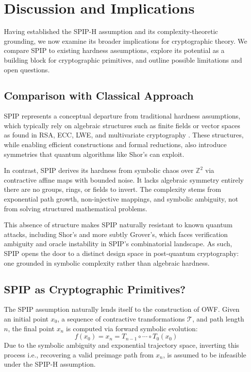 \documentclass[twocolumn,10pt]{article}
\begin{document}
\section{Discussion and Implications} \label{sec:discussion}
\vspace{0.8em}

Having established the SPIP-H assumption and its complexity-theoretic grounding, we now examine its broader implications for cryptographic theory. We compare SPIP to existing hardness assumptions, explore its potential as a building block for cryptographic primitives, and outline possible limitations and open questions.

\subsection{Comparison with Classical Approach}

SPIP represents a conceptual departure from traditional hardness assumptions, which typically rely on algebraic structures such as finite fields or vector spaces as found in RSA, ECC, LWE, and multivariate cryptography \cite{shor1994algorithms, regev2009lattices, patarin1996hidden}. These structures, while enabling efficient constructions and formal reductions, also introduce symmetries that quantum algorithms like Shor’s can exploit.

In contrast, SPIP derives its hardness from symbolic chaos over $\mathbb{Z}^2$ via contractive affine maps with bounded noise. It lacks algebraic symmetry entirely there are no groups, rings, or fields to invert. The complexity stems from exponential path growth, non-injective mappings, and symbolic ambiguity, not from solving structured mathematical problems.

This absence of structure makes SPIP naturally resistant to known quantum attacks, including Shor’s and more subtly Grover’s, which faces verification ambiguity and oracle instability in SPIP’s combinatorial landscape. As such, SPIP opens the door to a distinct design space in post-quantum cryptography: one grounded in symbolic complexity rather than algebraic hardness.

\subsection{SPIP as Cryptographic Primitives?}

The SPIP assumption naturally lends itself to the construction of OWF. Given an initial point $x_0$, a sequence of contractive transformations $\mathcal{T}$, and path length $n$, the final point $x_n$ is computed via forward symbolic evolution:
\[
f(x_0) = x_n = T_{n-1} \circ \cdots \circ T_0 (x_0)
\]
Due to the symbolic ambiguity and exponential trajectory space, inverting this process i.e., recovering a valid preimage path from $x_n$, is assumed to be infeasible under the SPIP-H assumption.
\end{document}
